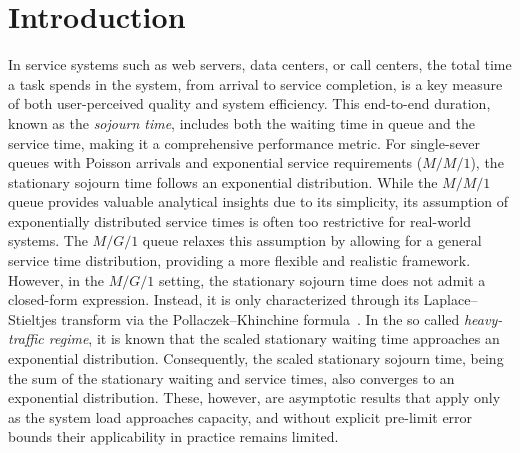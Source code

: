 \documentclass[11pt,letterpaper,reqno]{article}
\theoremstyle{thmstyleone}%
\theoremstyle{thmstyletwo}%
\theoremstyle{thmstylethree}%
\numberwithin{equation}{section}
\begin{document}

\maketitle
    
\section{Introduction}
\label{sec1}
In service systems such as web servers, data centers, or call centers, the total time a task spends in the system, from arrival to service completion, is a key measure of both user-perceived quality and system efficiency. This end-to-end duration, known as the \emph{sojourn time}, includes both the waiting time in queue and the service time, making it a comprehensive performance metric. For single-sever queues with Poisson arrivals and exponential service requirements ($M/M/1$), the stationary sojourn time follows an exponential distribution. While the $M/M/1$ queue provides valuable analytical insights due to its simplicity, its assumption of exponentially distributed service times is often too restrictive for real-world systems. 
The $M/G/1$ queue relaxes this assumption by allowing for a general service time distribution, providing a more flexible and realistic framework. However, in the $M/G/1$ setting, the stationary sojourn time does not admit a closed-form expression. Instead, it is only characterized through its Laplace–Stieltjes transform via the Pollaczek–Khinchine formula~\cite{Pollaczek30, Khinchin32, Daigle05}. In the so called \emph{heavy-traffic regime}, it is known that the scaled stationary waiting time approaches an exponential distribution. Consequently, the scaled stationary sojourn time, being the sum of the stationary waiting and service times, also converges to an exponential distribution. These, however, are asymptotic results that apply only as the system load approaches capacity, and without explicit pre-limit error bounds their applicability in practice remains limited.
\end{document}
